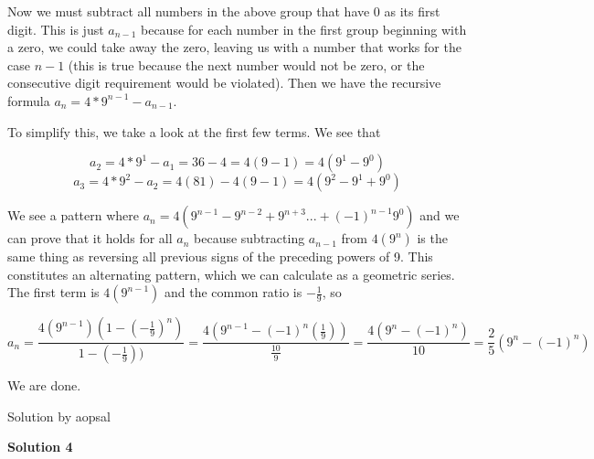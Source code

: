 \begin{enumerate}
 Now we must subtract all numbers in the above group that have 0 as its first digit. This is just $a_{n-1}$ because for each number in the first group beginning with a zero, we could take away the zero, leaving us with a number that works for the case $n-1$ (this is true because the next number would not be zero, or the consecutive digit requirement would be violated). Then we have the recursive formula $a_n = 4*9^{n-1}-a_{n-1}$.

 To simplify this, we take a look at the first few terms. We see that

 
 \[a_2 = 4*9^1-a_1 = 36-4 = 4(9-1) = 4(9^1-9^0)\]
 \[a_3 = 4*9^2-a_2 = 4(81) - 4(9-1) = 4(9^2-9^1+9^0)\]

 We see a pattern where $a_n = 4(9^{n-1}-9^{n-2}+9^{n+3}...+(-1)^{n-1}9^0)$ and we can prove that it holds for all $a_n$ because subtracting $a_{n-1}$ from $4(9^n)$ is the same thing as reversing all previous signs of the preceding powers of 9. This constitutes an alternating pattern, which we can calculate as a geometric series. The first term is $4(9^{n-1})$ and the common ratio is $-\frac{1}{9}$, so 

 
 \[a_n = \frac{4(9^{n-1})(1-(-\frac{1}{9})^n)}{1-(-\frac{1}{9}))} = \frac{4(9^{n-1}-(-1)^n(\frac{1}{9}))}{\frac{10}{9}} = \frac{4(9^{n}-(-1)^n)}{10} = \frac{2}{5}\left(9^n-(-1)^{n}\right)\]

 We are done.

 Solution by aopsal

 



\textbf{Solution 4}


\end{enumerate}
